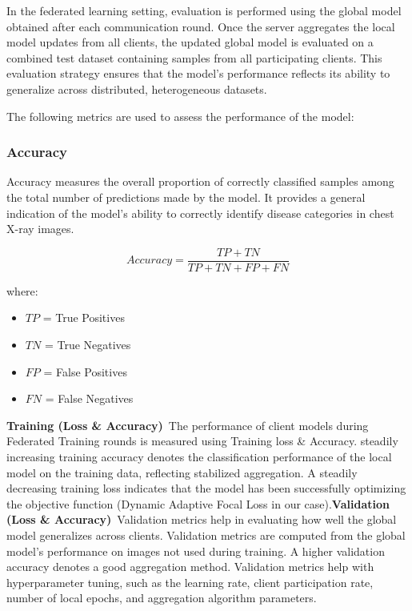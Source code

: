 \documentclass[12pt]{book}
\begin{document}
In the federated learning setting, evaluation is performed using the global model obtained after each communication round. Once the server aggregates the local model updates from all clients, the updated global model is evaluated on a combined test dataset containing samples from all participating clients. This evaluation strategy ensures that the model's performance reflects its ability to generalize across distributed, heterogeneous datasets.

The following metrics are used to assess the performance of the model:

\subsubsection{Accuracy}

Accuracy measures the overall proportion of correctly classified samples among the total number of predictions made by the model. It provides a general indication of the model’s ability to correctly identify disease categories in chest X-ray images.

\begin{equation}
Accuracy = \frac{TP + TN}{TP + TN + FP + FN}
\end{equation}

where:
\begin{itemize}
\item $TP$ = True Positives
\item $TN$ = True Negatives
\item $FP$ = False Positives
\item $FN$ = False Negatives
\end{itemize}

\textbf{Training (Loss & Accuracy)}\
The performance of client models during Federated Training rounds is measured using Training loss & Accuracy. steadily increasing training accuracy denotes the classification performance of the local model on the training data, reflecting stabilized aggregation.
A steadily decreasing training loss indicates that the model has been successfully optimizing the objective function (Dynamic Adaptive Focal Loss in our case).\textbf{Validation (Loss & Accuracy)}\
Validation metrics help in evaluating how well the global model generalizes across clients. Validation metrics are computed from the global model's performance on images not used during training. A higher validation accuracy denotes a good aggregation method.
Validation metrics help with hyperparameter tuning, such as the learning rate, client participation rate, number of local epochs, and aggregation algorithm parameters.
\end{document}

